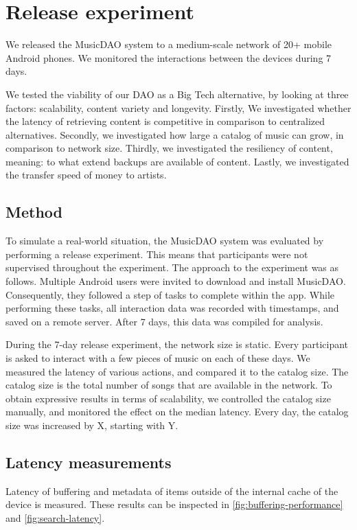 \chapter{Release experiment}\label{chap:release-experiment}
We released the MusicDAO system to a medium-scale network of 20+ mobile Android phones. We monitored the interactions between the devices during 7 days. 

We tested the viability of our DAO as a Big Tech alternative, by looking at three factors: scalability, content variety and longevity. Firstly, We investigated whether the latency of retrieving content is competitive in comparison to centralized alternatives. Secondly, we investigated how large a catalog of music can grow, in comparison to network size. Thirdly, we investigated the resiliency of content, meaning: to what extend backups are available of content. Lastly, we investigated the transfer speed of money to artists.

\section{Method}
To simulate a real-world situation, the MusicDAO system was evaluated by performing a release experiment. This means that participants were not supervised throughout the experiment. The approach to the experiment was as follows. Multiple Android users were invited to download and install MusicDAO. Consequently, they followed a step of tasks to complete within the app. While performing these tasks, all interaction data was recorded with timestamps, and saved on a remote server. After 7 days, this data was compiled for analysis.

During the 7-day release experiment, the network size is static. Every participant is asked to interact with a few pieces of music on each of these days. We measured the latency of various actions, and compared it to the catalog size. The catalog size is the total number of songs that are available in the network. To obtain expressive results in terms of scalability, we controlled the catalog size manually, and monitored the effect on the median latency. Every day, the catalog size was increased by X, starting with Y.

\section{Latency measurements}
Latency of buffering and metadata of items outside of the internal cache of the device is measured. These results can be inspected in \ref{fig:buffering-performance} and \ref{fig:search-latency}.

